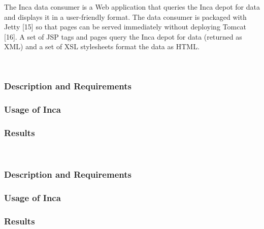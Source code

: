 \documentclass[times, 10pt,twocolumn]{article}
\begin{document}

The Inca data consumer is a Web application that queries the Inca depot for
data and displays it in a user-friendly format.  The data consumer is
packaged with Jetty [15] so that pages can be served immediately without
deploying Tomcat [16].  A set of JSP tags and pages query the Inca depot for
data (returned as XML) and a set of XSL stylesheets format the data as HTML.

~\newpage
~\newpage
~\newpage
~\newpage

\label{usecases}


\subsubsection{Description and Requirements}


\subsubsection{Usage of Inca}


\subsubsection{Results}


~\newpage


\subsubsection{Description and Requirements}


\subsubsection{Usage of Inca}


\subsubsection{Results}
\end{document}
